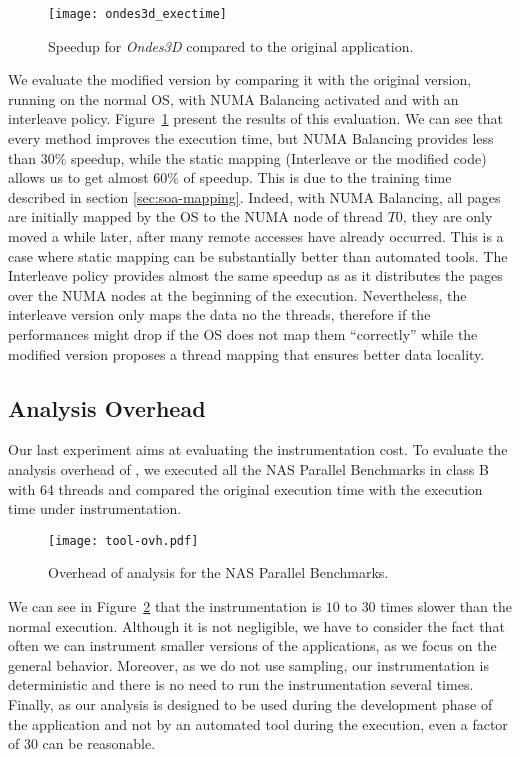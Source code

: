 \begin{figure}[!t]
    \centering
    \texttt{[image: ondes3d\_exectime]}
    \caption{Speedup for \emph{Ondes3D} compared to the original application.}
\label{fig:ondes-res}
\end{figure}

We evaluate the modified version by comparing it with the original
version, running on the normal OS, with NUMA Balancing activated and with an
interleave policy. Figure~\ref{fig:ondes-res} present the results of this
evaluation. We can see that every method improves the execution time, but
NUMA Balancing provides less than $30\%$ speedup, while the static mapping
(Interleave or the modified code) allows us to get almost $60\%$ of speedup. This is
due to the training time described in section \ref{sec:soa-mapping}. Indeed,
with NUMA Balancing, all pages are initially mapped by the OS to the NUMA node of thread $T0$, they
are only moved a while later, after many remote accesses have already occurred. This is a case where static mapping can be substantially better than automated
tools.  The Interleave policy provides almost the same speedup as
\TABARNAC as it distributes the pages over the NUMA nodes at the beginning of
the execution. Nevertheless, the interleave version only maps the data no the
threads, therefore if the performances might drop if the OS does not map them
``correctly'' while the modified version proposes a thread mapping that ensures better
data locality.

\subsection{Analysis Overhead}
\label{sec:expe-overhead}

Our last experiment aims at evaluating the instrumentation cost. To evaluate the analysis overhead of \TABARNAC, we
executed all the NAS Parallel Benchmarks in class B with 64 threads and compared
the original execution time with the execution time under instrumentation.

\begin{figure}[!t]
    \centering
    \texttt{[image: tool-ovh.pdf]}
    \caption{Overhead of \TABARNAC analysis for the NAS Parallel Benchmarks.}
    \label{fig:ovh}
\end{figure}


We can see in Figure~\ref{fig:ovh} that
the instrumentation is $10$ to $30$ times slower than the normal execution. Although it is
not negligible, we have to consider the fact that often we can instrument
smaller versions of the applications, as we focus on the general behavior.
Moreover, as we do not use sampling, our instrumentation is deterministic and
there is no need to run the instrumentation several times. Finally, as our
analysis is designed to be used during the development phase of the
application and not by an automated tool during the execution, even a factor of $30$
can be reasonable.

